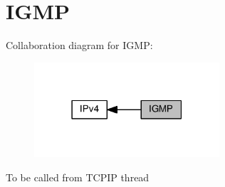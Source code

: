 \hypertarget{group__igmp}{}\section{I\+G\+MP}
\label{group__igmp}
Collaboration diagram for I\+G\+MP\+:
\nopagebreak
\begin{figure}[H]
\begin{center}
\leavevmode
\includegraphics[width=195pt]{group__igmp}
\end{center}
\end{figure}
To be called from T\+C\+P\+IP thread 